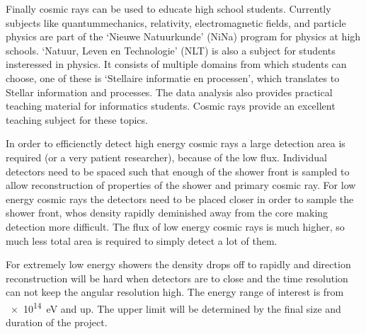 Finally cosmic rays can be used to educate high school students. Currently subjects like quantummechanics, relativity, electromagnetic fields, and particle physics are part of the `Nieuwe Natuurkunde' (NiNa) program for physics at high schools. `Natuur, Leven en Technologie' (NLT) is also a subject for students insteressed in physics. It consists of multiple domains from which students can choose, one of these is `Stellaire informatie en processen', which translates to Stellar information and processes. The data analysis also provides practical teaching material for informatics students. Cosmic rays provide an excellent teaching subject for these topics.

In order to efficienctly detect high energy cosmic rays a large detection area is required (or a very patient researcher), because of the low flux. Individual detectors need to be spaced such that enough of the shower front is sampled to allow reconstruction of properties of the shower and primary cosmic ray. For low energy cosmic rays the detectors need to be placed closer in order to sample the shower front, whos density rapidly deminished away from the core making detection more difficult. The flux of low energy cosmic rays is much higher, so much less total area is required to simply detect a lot of them.

For extremely low energy showers the density drops off to rapidly and direction reconstruction will be hard when detectors are to close and the time resolution can not keep the angular resolution high. The energy range of interest is from \SI{e14}{\eV} and up. The upper limit will be determined by the final size and duration of the project.

